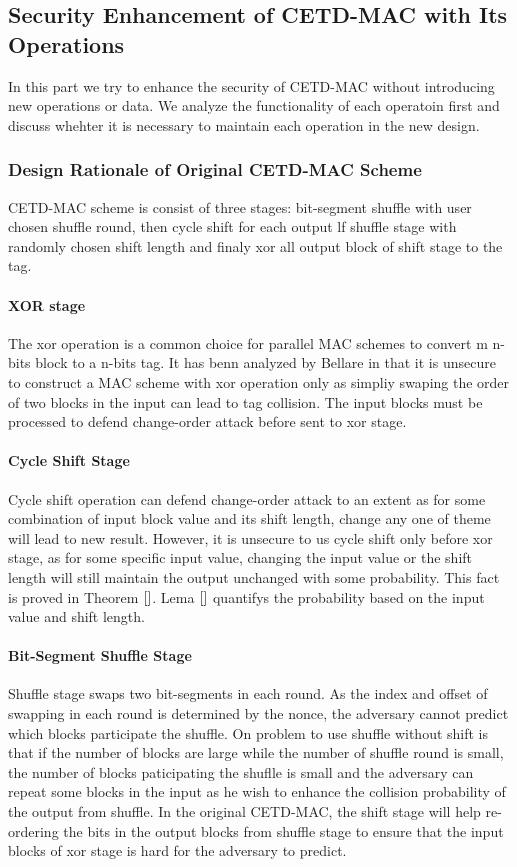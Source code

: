 \documentclass{article}
\begin{document}
\subsection{Security Enhancement of CETD-MAC with Its Operations}
In this part we try to enhance the security of CETD-MAC without introducing new operations or data. We analyze the functionality of each operatoin first and discuss whehter it is necessary to maintain each operation in the new design.
\subsubsection{Design Rationale of Original CETD-MAC Scheme}
CETD-MAC scheme is consist of three stages: bit-segment shuffle with user chosen shuffle round, then cycle shift for each output lf shuffle stage with randomly chosen shift length and finaly xor all output block of shift stage to the tag.
\paragraph{XOR stage}
The xor operation is a common choice for parallel MAC schemes to convert m n-bits block to a n-bits tag. It has benn analyzed by Bellare in \cite{} that it is unsecure to construct a MAC scheme with xor operation only as simpliy swaping the order of two blocks in the input can lead to tag collision.  The input blocks must be processed to defend change-order attack before sent to xor stage.
\paragraph{Cycle Shift Stage}
Cycle shift operation can defend change-order attack to an extent as for some combination of input block value and its shift length, change any one of theme will lead to new result. However, it is unsecure to us cycle shift only before xor stage, as for some specific input value, changing the input value or the shift length will still maintain the output unchanged with some probability. This fact is proved in Theorem $\ref{}$. Lema $\ref{}$ quantifys the probability based on the input value and shift length. 
\paragraph{Bit-Segment Shuffle Stage}
Shuffle stage swaps two bit-segments in each round. As the index and offset of swapping in each round is determined by the nonce, the adversary cannot predict which blocks participate the shuffle. On problem to use shuffle without shift is that if the number of blocks are large while the number of shuffle round is small, the number of blocks paticipating the shuflle is small and the adversary can repeat some blocks in the input as he wish to enhance the collision probability of the output from shuffle.  In the original CETD-MAC, the shift stage will help re-ordering the bits in the output blocks from shuffle stage to ensure that the input blocks of xor stage is hard for the adversary to predict. 
\end{document}
